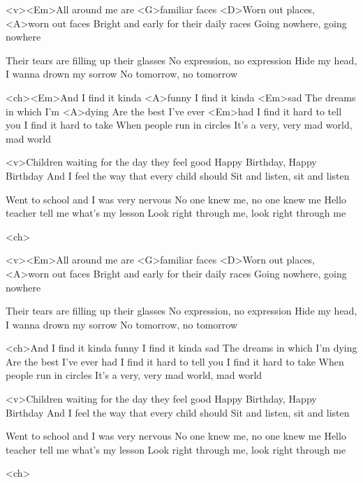 



	\begin{song}
		<v><Em>All around me are <G>familiar faces
		<D>Worn out places, <A>worn out faces
		Bright and early for their daily races
		Going nowhere, going nowhere
			
		Their tears are filling up their glasses
		No expression, no expression
		Hide my head, I wanna drown my sorrow
		No tomorrow, no tomorrow

		<ch><Em>And I find it kinda <A>funny
		I find it kinda <Em>sad
		The dreams in which I'm <A>dying
		Are the best I've ever <Em>had
		I find it hard to tell you
		I find it hard to take
		When people run in circles
		It's a very, very mad world, mad world

		<v>Children waiting for the day they feel good
		Happy Birthday, Happy Birthday
		And I feel the way that every child should
		Sit and listen, sit and listen

		Went to school and I was very nervous
		No one knew me, no one knew me
		Hello teacher tell me what's my lesson
		Look right through me, look right through me

		<ch>
	\end{song}
	\begin{song}
		<v><Em>All around me are <G>familiar faces
		<D>Worn out places, <A>worn out faces
		Bright and early for their daily races
		Going nowhere, going nowhere
			
		Their tears are filling up their glasses
		No expression, no expression
		Hide my head, I wanna drown my sorrow
		No tomorrow, no tomorrow

		<ch>And I find it kinda funny
		I find it kinda sad
		The dreams in which I'm dying
		Are the best I've ever had
		I find it hard to tell you
		I find it hard to take
		When people run in circles
		It's a very, very mad world, mad world

		<v>Children waiting for the day they feel good
		Happy Birthday, Happy Birthday
		And I feel the way that every child should
		Sit and listen, sit and listen

		Went to school and I was very nervous
		No one knew me, no one knew me
		Hello teacher tell me what's my lesson
		Look right through me, look right through me

		<ch>
	\end{song}



